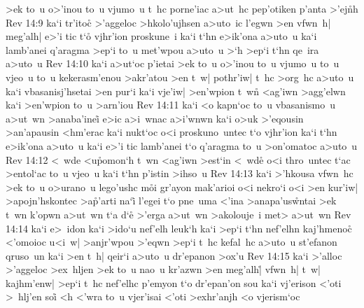 >ek
to~u
o>'inou
to~u
vjumo~u
t~hc
porne'iac
a>ut~hc
pep'otiken
p'anta
>'ej\r{n}h\bibvsend
{}
\vs Rev 14:9
ka`i
tr'itoc\r{}
>'aggeloc
>hkolo'ujhsen
a>uto~ic
l'egwn
>en
vfwn~h|
meg'alh|
e>'i
tic
t`o\r{}
vjhr'ion
proskune~i
ka`i
t`hn
e>ik'ona
a>uto~u
ka`i
lamb'anei
q'aragma
>ep`i
to~u
met'wpou
a>uto~u
>`h
>ep`i
t`hn
qe~ira
a>uto~u\bibvsend
\vs Rev 14:10
ka`i
a>ut`oc
p'ietai
>ek
to~u
o>'inou
to~u
vjumo~u
to~u
vjeo~u
to~u
kekerasm'enou
>akr'atou
>en
t~w|
pothr'iw|
t~hc
>org~hc
a>uto~u
ka`i
vbasanisj'hsetai
>en
pur`i
ka`i
vje'iw|
>en'wpion
t~wn\r{}
<ag'iwn
>agg'elwn
ka`i
>en'wpion
to~u
>arn'iou\bibvsend
\vs Rev 14:11
ka`i
<o
kapn`oc
to~u
vbasanismo~u
a>ut~wn
>anaba'inei\r{}
e>ic
a>i~wnac
a>i'wnwn
ka`i
o>uk
>'eqousin
>an'apausin
<hm'erac
ka`i
nukt`oc
o<i
proskuno~untec
t`o
vjhr'ion
ka`i
t`hn
e>ik'ona
a>uto~u
ka`i
e>'i
tic
lamb'anei
t`o
q'aragma
to~u
>on'omatoc
a>uto~u\bibvsend
\vs Rev 14:12
<~wde
<u\r{p}omon`h
t~wn
<ag'iwn
>est`in
<~wd\r{e}
o<i
thro~untec
t`ac
>entol`ac
to~u
vjeo~u
ka`i
t`hn
p'istin
>ihso~u\bibvsend
\vs Rev 14:13
ka`i
>'hkousa
vfwn~hc
>ek
to~u
o>urano~u
lego'ushc
m\r{o}i
gr'ayon
mak'arioi
o<i
nekro`i
o<i
>en
kur'iw|
>apojn'hskontec
>a\r{p}'arti
na`i\r{}
l'egei
t`o
pne~uma
<'ina
>anapa'us\r{w}ntai
>ek
t~wn
k'opwn
a>ut~wn
t`a
d`e\r{}
>'erga
a>ut~wn
>akolouje~i
met>
a>ut~wn\bibvsend
\vs Rev 14:14
ka`i
e>~idon
ka`i
>ido`u
nef'elh
leuk`h
ka`i
>ep`i
t`hn
nef'elhn
kaj'hmenoc\r{}
<'omoioc
u<i~w|
>anjr'wpou
>'eqwn
>ep`i
t~hc
kefal~hc
a>uto~u
st'efanon
qruso~un
ka`i
>en
t~h|
qeir`i
a>uto~u
dr'epanon
>ox'u\bibvsend
\vs Rev 14:15
ka`i
>'alloc
>'aggeloc
>ex~hljen
>ek
to~u
nao~u
kr'azwn
>en
meg'alh|\r{}
vfwn~h|
t~w|
kajhm'enw|
>ep`i
t~hc
nef'elhc
p'emyon
t`o
dr'epan'on
sou
ka`i
vj'erison
<'oti
>~hlj'en
soi\r{}
<h
<'wra
to~u
vjer'isai
<'oti
>exhr'anjh
<o
vjerism`oc
